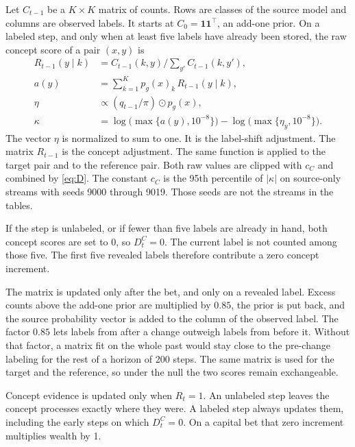 \documentclass[11pt,a4paper]{article}
\theoremstyle{definition}
\newcommand{\1}{\mathbf{1}}
\begin{document}
Let \(C_{t-1}\) be a \(K\times K\) matrix of counts. Rows are classes of the source model and columns are observed labels. It starts at \(C_0=\mathbf{1}\mathbf{1}^\top\), an add-one prior. On a labeled step, and only when at least five labels have already been stored, the raw concept score of a pair \((x,y)\) is
\begin{equation}
\begin{aligned}
R_{t-1}(y\mid k)&=C_{t-1}(k,y)\Big/\sum_{y'}C_{t-1}(k,y'),\\
a(y)&=\sum_{k=1}^{K}p_g(x)_k\,R_{t-1}(y\mid k),\\
\eta&\propto (q_{t-1}/\pi)\odot p_g(x),\\
\kappa&=\log\big(\max\{a(y),10^{-8}\}\big)-\log\big(\max\{\eta_y,10^{-8}\}\big).
\end{aligned}
\label{eq:concept}
\end{equation}
The vector \(\eta\) is normalized to sum to one. It is the label-shift adjustment. The matrix \(R_{t-1}\) is the concept adjustment. The same function is applied to the target pair and to the reference pair. Both raw values are clipped with \(c_C\) and combined by \eqref{eq:D}. The constant \(c_C\) is the 95th percentile of \(|\kappa|\) on source-only streams with seeds 9000 through 9019. Those seeds are not the streams in the tables.

If the step is unlabeled, or if fewer than five labels are already in hand, both concept scores are set to 0, so \(D^C_t=0\). The current label is not counted among those five. The first five revealed labels therefore contribute a zero concept increment.

The matrix is updated only after the bet, and only on a revealed label. Excess counts above the add-one prior are multiplied by \(0.85\), the prior is put back, and the source probability vector is added to the column of the observed label. The factor \(0.85\) lets labels from after a change outweigh labels from before it. Without that factor, a matrix fit on the whole past would stay close to the pre-change labeling for the rest of a horizon of 200 steps. The same matrix is used for the target and the reference, so under the null the two scores remain exchangeable.

Concept evidence is updated only when \(R_t=1\). An unlabeled step leaves the concept processes exactly where they were. A labeled step always updates them, including the early steps on which \(D^C_t=0\). On a capital bet that zero increment multiplies wealth by 1.
\end{document}
